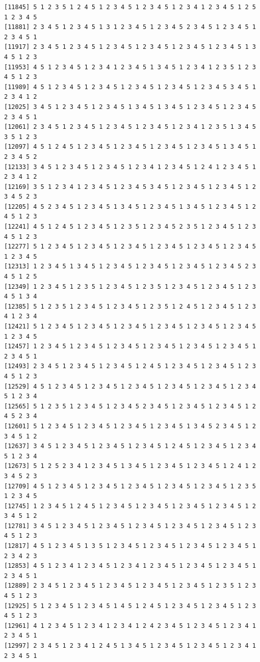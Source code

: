\documentclass[
  english,
]{book}
\begin{document}
\begin{verbatim}
[11845] 5 1 2 3 5 1 2 4 5 1 2 3 4 5 1 2 3 4 5 1 2 3 4 1 2 3 4 5 1 2 5 1 2 3 4 5
[11881] 2 3 4 5 1 2 3 4 5 1 3 1 2 3 4 5 1 2 3 4 5 2 3 4 5 1 2 3 4 5 1 2 3 4 5 1
[11917] 2 3 4 5 1 2 3 4 5 1 2 3 4 5 1 2 3 4 5 1 2 3 4 5 1 2 3 4 5 1 3 4 5 1 2 3
[11953] 4 5 1 2 3 4 5 1 2 3 4 1 2 3 4 5 1 3 4 5 1 2 3 4 1 2 3 5 1 2 3 4 5 1 2 3
[11989] 4 5 1 2 3 4 5 1 2 3 4 5 1 2 3 4 5 1 2 3 4 5 1 2 3 4 5 3 4 5 1 2 3 4 1 2
[12025] 3 4 5 1 2 3 4 5 1 2 3 4 5 1 3 4 5 1 3 4 5 1 2 3 4 5 1 2 3 4 5 2 3 4 5 1
[12061] 2 3 4 5 1 2 3 4 5 1 2 3 4 5 1 2 3 4 5 1 2 3 4 1 2 3 5 1 3 4 5 3 5 1 2 3
[12097] 4 5 1 2 4 5 1 2 3 4 5 1 2 3 4 5 1 2 3 4 5 1 2 3 4 5 1 3 4 5 1 2 3 4 5 2
[12133] 3 4 5 1 2 3 4 5 1 2 3 4 5 1 2 3 4 1 2 3 4 5 1 2 4 1 2 3 4 5 1 2 3 4 1 2
[12169] 3 5 1 2 3 4 1 2 3 4 5 1 2 3 4 5 3 4 5 1 2 3 4 5 1 2 3 4 5 1 2 3 4 5 2 3
[12205] 4 5 2 3 4 5 1 2 3 4 5 1 3 4 5 1 2 3 4 5 1 3 4 5 1 2 3 4 5 1 2 4 5 1 2 3
[12241] 4 5 1 2 4 5 1 2 3 4 5 1 2 3 5 1 2 3 4 5 2 3 5 1 2 3 4 5 1 2 3 4 5 1 2 3
[12277] 5 1 2 3 4 5 1 2 3 4 5 1 2 3 4 5 1 2 3 4 5 1 2 3 4 5 1 2 3 4 5 1 2 3 4 5
[12313] 1 2 3 4 5 1 3 4 5 1 2 3 4 5 1 2 3 4 5 1 2 3 4 5 1 2 3 4 5 2 3 4 5 1 2 5
[12349] 1 2 3 4 5 1 2 3 5 1 2 3 4 5 1 2 3 5 1 2 3 4 5 1 2 3 4 5 1 2 3 4 5 1 3 4
[12385] 5 1 2 3 5 1 2 3 4 5 1 2 3 4 5 1 2 3 5 1 2 4 5 1 2 3 4 5 1 2 3 4 1 2 3 4
[12421] 5 1 2 3 4 5 1 2 3 4 5 1 2 3 4 5 1 2 3 4 5 1 2 3 4 5 1 2 3 4 5 1 2 3 4 5
[12457] 1 2 3 4 5 1 2 3 4 5 1 2 3 4 5 1 2 3 4 5 1 2 3 4 5 1 2 3 4 5 1 2 3 4 5 1
[12493] 2 3 4 5 1 2 3 4 5 1 2 3 4 5 1 2 4 5 1 2 3 4 5 1 2 3 4 5 1 2 3 4 5 1 2 3
[12529] 4 5 1 2 3 4 5 1 2 3 4 5 1 2 3 4 5 1 2 3 4 5 1 2 3 4 5 1 2 3 4 5 1 2 3 4
[12565] 5 1 2 3 5 1 2 3 4 5 1 2 3 4 5 2 3 4 5 1 2 3 4 5 1 2 3 4 5 1 2 4 5 2 3 4
[12601] 5 1 2 3 4 5 1 2 3 4 5 1 2 3 4 5 1 2 3 4 5 1 3 4 5 2 3 4 5 1 2 3 4 5 1 2
[12637] 3 4 5 1 2 3 4 5 1 2 3 4 5 1 2 3 4 5 1 2 4 5 1 2 3 4 5 1 2 3 4 5 1 2 3 4
[12673] 5 1 2 5 2 3 4 1 2 3 4 5 1 3 4 5 1 2 3 4 5 1 2 3 4 5 1 2 4 1 2 3 4 5 2 3
[12709] 4 5 1 2 3 4 5 1 2 3 4 5 1 2 3 4 5 1 2 3 4 5 1 2 3 4 5 1 2 3 5 1 2 3 4 5
[12745] 1 2 3 4 5 1 2 4 5 1 2 3 4 5 1 2 3 4 5 1 2 3 4 5 1 2 3 4 5 1 2 3 4 5 1 2
[12781] 3 4 5 1 2 3 4 5 1 2 3 4 5 1 2 3 4 5 1 2 3 4 5 1 2 3 4 5 1 2 3 4 5 1 2 3
[12817] 4 5 1 2 3 4 5 1 3 5 1 2 3 4 5 1 2 3 4 5 1 2 3 4 5 1 2 3 4 5 1 2 3 4 2 3
[12853] 4 5 1 2 3 4 1 2 3 4 5 1 2 3 4 1 2 3 4 5 1 2 3 4 5 1 2 3 4 5 1 2 3 4 5 1
[12889] 2 3 4 5 1 2 3 4 5 1 2 3 4 5 1 2 3 4 5 1 2 3 4 5 1 2 3 5 1 2 3 4 5 1 2 3
[12925] 5 1 2 3 4 5 1 2 3 4 5 1 4 5 1 2 4 5 1 2 3 4 5 1 2 3 4 5 1 2 3 4 5 1 2 3
[12961] 4 1 2 3 4 5 1 2 3 4 1 2 3 4 1 2 4 2 3 4 5 1 2 3 4 5 1 2 3 4 1 2 3 4 5 1
[12997] 2 3 4 5 1 2 3 4 1 2 4 5 1 3 4 5 1 2 3 4 5 1 2 3 4 5 1 2 3 4 1 2 3 4 5 1

\end{verbatim}
\end{document}
